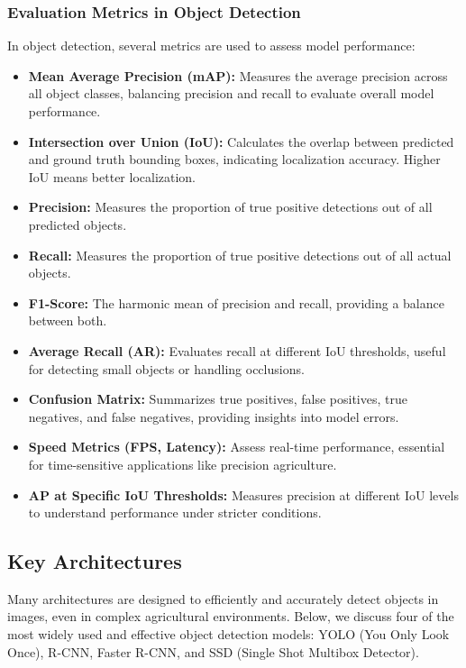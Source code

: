 \subsubsection{Evaluation Metrics in Object Detection}    
In object detection, several metrics are used to assess model performance:
\begin{itemize}
    \item \textbf{Mean Average Precision (mAP):} Measures the average precision across all object classes, balancing precision and recall to evaluate overall model performance.
    \item \textbf{Intersection over Union (IoU):} Calculates the overlap between predicted and ground truth bounding boxes, indicating localization accuracy. Higher IoU means better localization.
    \item \textbf{Precision:} Measures the proportion of true positive detections out of all predicted objects.
    \item \textbf{Recall:} Measures the proportion of true positive detections out of all actual objects.
    \item \textbf{F1-Score:} The harmonic mean of precision and recall, providing a balance between both.
    \item \textbf{Average Recall (AR):} Evaluates recall at different IoU thresholds, useful for detecting small objects or handling occlusions.
    \item \textbf{Confusion Matrix:} Summarizes true positives, false positives, true negatives, and false negatives, providing insights into model errors.
    \item \textbf{Speed Metrics (FPS, Latency):} Assess real-time performance, essential for time-sensitive applications like precision agriculture.
    \item \textbf{AP at Specific IoU Thresholds:} Measures precision at different IoU levels to understand performance under stricter conditions.
\end{itemize}

\subsection{Key Architectures}
Many architectures are designed to efficiently and accurately detect objects in images, even in complex agricultural environments. Below, we discuss four of the most widely used and effective object detection models: YOLO (You Only Look Once), R-CNN, Faster R-CNN, and SSD (Single Shot Multibox Detector). 


